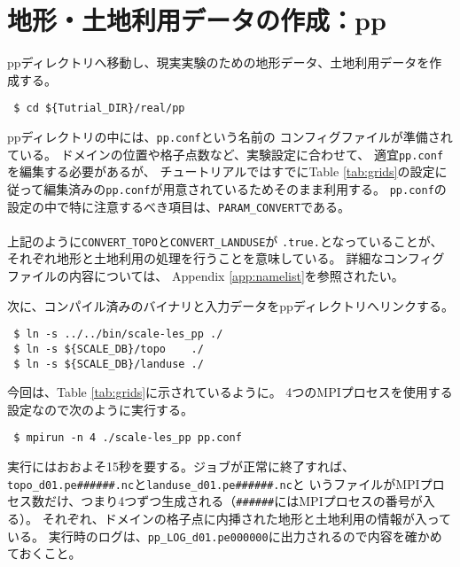 
\section{地形・土地利用データの作成：pp}

ppディレクトリへ移動し、現実実験のための地形データ、土地利用データを作成する。
\begin{verbatim}
 $ cd ${Tutrial_DIR}/real/pp
\end{verbatim}
ppディレクトリの中には、\verb|pp.conf|という名前の
コンフィグファイルが準備されている。
ドメインの位置や格子点数など、実験設定に合わせて、
適宜\verb|pp.conf|を編集する必要があるが、
チュートリアルではすでにTable \ref{tab:grids}の設定に
従って編集済みの\verb|pp.conf|が用意されているためそのまま利用する。
\verb|pp.conf|の設定の中で特に注意するべき項目は、\verb|PARAM_CONVERT|である。\\

\\

\noindent 上記のように\verb|CONVERT_TOPO|と\verb|CONVERT_LANDUSE|が
\verb|.true.|となっていることが、
それぞれ地形と土地利用の処理を行うことを意味している。
詳細なコンフィグファイルの内容については、
Appendix \ref{app:namelist}を参照されたい。

次に、コンパイル済みのバイナリと入力データをppディレクトリへリンクする。
\begin{verbatim}
 $ ln -s ../../bin/scale-les_pp ./
 $ ln -s ${SCALE_DB}/topo    ./
 $ ln -s ${SCALE_DB}/landuse ./
\end{verbatim}
今回は、Table \ref{tab:grids}に示されているように。
4つのMPIプロセスを使用する設定なので次のように実行する。
\begin{verbatim}
 $ mpirun -n 4 ./scale-les_pp pp.conf
\end{verbatim}
実行にはおおよそ15秒を要する。ジョブが正常に終了すれば、\verb|topo_d01.pe######.nc|と\verb|landuse_d01.pe######.nc|と
いうファイルがMPIプロセス数だけ、つまり4つずつ生成される（\verb|######|にはMPIプロセスの番号が入る）。
それぞれ、ドメインの格子点に内挿された地形と土地利用の情報が入っている。
実行時のログは、\verb|pp_LOG_d01.pe000000|に出力されるので内容を確かめておくこと。


